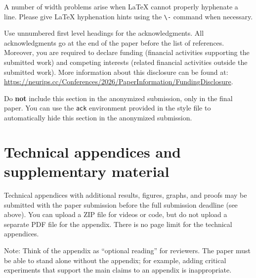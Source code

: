 \documentclass{article}
\begin{document}
A number of width problems arise when \LaTeX{} cannot properly hyphenate a
line. Please give LaTeX hyphenation hints using the \verb+\-+ command when
necessary.

\begin{ack}
Use unnumbered first level headings for the acknowledgments. All acknowledgments
go at the end of the paper before the list of references. Moreover, you are required to declare
funding (financial activities supporting the submitted work) and competing interests (related financial activities outside the submitted work).
More information about this disclosure can be found at: \url{https://neurips.cc/Conferences/2026/PaperInformation/FundingDisclosure}.


Do {\bf not} include this section in the anonymized submission, only in the final paper. You can use the \texttt{ack} environment provided in the style file to automatically hide this section in the anonymized submission.
\end{ack}







\appendix

\section{Technical appendices and supplementary material}
Technical appendices with additional results, figures, graphs, and proofs may be submitted with the paper submission before the full submission deadline (see above). You can upload a ZIP file for videos or code, but do not upload a separate PDF file for the appendix. There is no page limit for the technical appendices. 

Note: Think of the appendix as ``optional reading'' for reviewers. The paper must be able to stand alone without the appendix; for example, adding critical experiments that support the main claims to an appendix is inappropriate. 


\newpage

\end{document}
